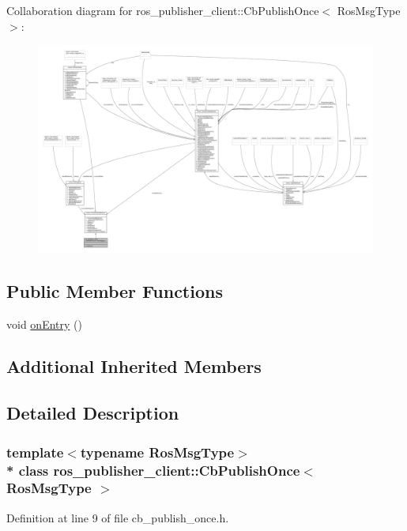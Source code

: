 Collaboration diagram for ros\+\_\+publisher\+\_\+client\+:\+:Cb\+Publish\+Once$<$ Ros\+Msg\+Type $>$\+:
\nopagebreak
\begin{figure}[H]
\begin{center}
\leavevmode
\includegraphics[width=350pt]{classros__publisher__client_1_1CbPublishOnce__coll__graph}
\end{center}
\end{figure}
\subsection*{Public Member Functions}
\begin{DoxyCompactItemize}
\item 
void \hyperlink{classros__publisher__client_1_1CbPublishOnce_a7073167a98ec60cfc243b0809096ffb8}{on\+Entry} ()
\end{DoxyCompactItemize}
\subsection*{Additional Inherited Members}


\subsection{Detailed Description}
\subsubsection*{template$<$typename Ros\+Msg\+Type$>$\\*
class ros\+\_\+publisher\+\_\+client\+::\+Cb\+Publish\+Once$<$ Ros\+Msg\+Type $>$}



Definition at line 9 of file cb\+\_\+publish\+\_\+once.\+h.



